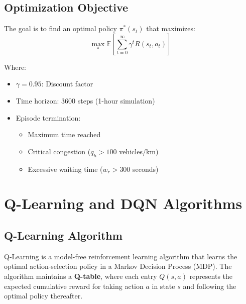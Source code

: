 \documentclass[a4paper, 12pt]{article}
\begin{document}
\subsection{Optimization Objective}
\begin{tcolorbox}[title=Policy Optimization]
The goal is to find an optimal policy \( \pi^*(s_t) \) that maximizes:
\[
\max_\pi \mathbb{E} \left[ \sum_{t=0}^\infty \gamma^t R(s_t, a_t) \right]
\]

Where:
\begin{itemize}
    \item \( \gamma = 0.95 \): Discount factor
    \item Time horizon: 3600 steps (1-hour simulation)
    \item Episode termination:
    \begin{itemize}
        \item Maximum time reached
        \item Critical congestion (\( q_h > 100 \) vehicles/km)
        \item Excessive waiting time (\( w_r > 300 \) seconds)
    \end{itemize}
\end{itemize}
\end{tcolorbox}

\section{Q-Learning and DQN Algorithms}

\subsection{Q-Learning Algorithm}
Q-Learning is a model-free reinforcement learning algorithm that learns the optimal action-selection policy in a Markov Decision Process (MDP). The algorithm maintains a \textbf{Q-table}, where each entry \( Q(s, a) \) represents the expected cumulative reward for taking action \( a \) in state \( s \) and following the optimal policy thereafter.
\end{document}
